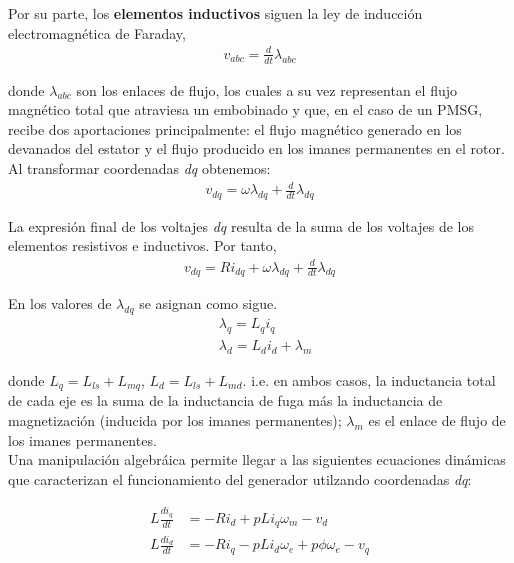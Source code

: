 {Por su parte, los \textbf{elementos inductivos} siguen la ley de inducción electromagnética de Faraday,
\begin{align}
    v_{abc} = \frac{d}{dt}\lambda_{abc}
\end{align}

donde $\lambda_{abc}$ son los enlaces de flujo, los cuales a su vez representan el 
flujo magnético total que atraviesa un embobinado y que, en el caso de un PMSG, recibe dos aportaciones principalmente:
el flujo magnético generado en los devanados del estator y el flujo producido en los imanes permanentes en el rotor.
Al transformar coordenadas \emph{dq} obtenemos:
\begin{align}
    v_{dq} = \omega\lambda_{dq} + \frac{d}{dt}\lambda_{dq}
\end{align}

La expresión final de los voltajes \emph{dq} resulta de la suma de los voltajes de los elementos resistivos e inductivos. 
Por tanto,
\begin{align}
    v_{dq} = Ri_{dq} + \omega\lambda_{dq} + \frac{d}{dt}\lambda_{dq}
\end{align}

En \cite{krause2013} los valores de $\lambda_{dq}$ se asignan como sigue. 
\begin{align}
    &\lambda_q = L_q i_q
    \\ 
    &\lambda_d = L_d i_d + \lambda_m
\end{align}

donde $L_q = L_{ls} + L_{mq}$, $L_d = L_{ls} + L_{md}$. i.e. en ambos casos, la inductancia total de cada eje es la suma de la inductancia
de fuga más la inductancia de magnetización (inducida por los imanes permanentes); $\lambda_m$ es el enlace de flujo de los imanes permanentes.
\\

Una manipulación algebráica permite llegar a las siguientes ecuaciones dinámicas que caracterizan el funcionamiento 
del generador utilzando coordenadas \emph{dq}:


\begin{equation}
    \begin{aligned}
        L\frac{di_q}{dt} &= -Ri_d + pLi_q\omega_m - v_d
        \\
        L\frac{di_d}{dt} &= -Ri_q - pLi_d\omega_e + p\phi\omega_e - v_q 
    \end{aligned}
    \label{eq:electrical_subsystem}
\end{equation}

}
